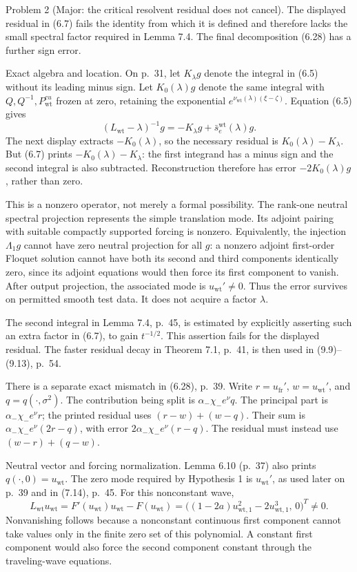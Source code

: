 \documentclass[10pt]{article}
\begin{document}
Problem 2 (Major: the critical resolvent residual does not cancel).  The displayed residual in (6.7) fails the identity from which it is defined and therefore lacks the small spectral factor required in Lemma 7.4. The final decomposition (6.28) has a further sign error.\par
Exact algebra and location. On p. 31, let \(K_\lambda g\) denote the integral in (6.5) without its leading minus sign. Let \(K_0(\lambda)g\) denote the same integral with \(Q,Q^{-1},P_\mathrm{wt}^{cu}\) frozen at zero, retaining the exponential \(e^{\nu_\mathrm{wt}(\lambda)(\xi-\zeta)}\). Equation (6.5) gives \[(L_\mathrm{wt}-\lambda)^{-1}g=-K_\lambda g+\bar s_e^\mathrm{wt}(\lambda)g.\] The next display extracts \(-K_0(\lambda)\), so the necessary residual is \(K_0(\lambda)-K_\lambda\). But (6.7) prints \(-K_0(\lambda)-K_\lambda\): the first integrand has a minus sign and the second integral is also subtracted. Reconstruction therefore has error \(-2K_0(\lambda)g\), rather than zero.\par
This is a nonzero operator, not merely a formal possibility. The rank-one neutral spectral projection represents the simple translation mode. Its adjoint pairing with suitable compactly supported forcing is nonzero. Equivalently, the injection \(\Lambda_1 g\) cannot have zero neutral projection for all \(g\): a nonzero adjoint first-order Floquet solution cannot have both its second and third components identically zero, since its adjoint equations would then force its first component to vanish. After output projection, the associated mode is \(u_\mathrm{wt}'\ne0\). Thus the error survives on permitted smooth test data. It does not acquire a factor \(\lambda\).\par
The second integral in Lemma 7.4, p. 45, is estimated by explicitly asserting such an extra factor in (6.7), to gain \(t^{-1/2}\). This assertion fails for the displayed residual. The faster residual decay in Theorem 7.1, p. 41, is then used in (9.9)–(9.13), p. 54.\par
There is a separate exact mismatch in (6.28), p. 39. Write \(r=u_\mathrm{fr}'\), \(w=u_\mathrm{wt}'\), and \(q=q(\cdot,\sigma^2)\). The contribution being split is \(\alpha_-\chi_-e^\nu q\). The principal part is \(\alpha_-\chi_-e^\nu r\); the printed residual uses \((r-w)+(w-q)\). Their sum is \(\alpha_-\chi_-e^\nu(2r-q)\), with error \(2\alpha_-\chi_-e^\nu(r-q)\). The residual must instead use \((w-r)+(q-w)\).\par
Neutral vector and forcing normalization. Lemma 6.10 (p. 37) also prints \(q(\cdot,0)=u_\mathrm{wt}\). The zero mode required by Hypothesis 1 is \(u_\mathrm{wt}'\), as used later on p. 39 and in (7.14), p. 45. For this nonconstant wave, \[L_\mathrm{wt}u_\mathrm{wt}=F'(u_\mathrm{wt})u_\mathrm{wt}-F(u_\mathrm{wt})
       =\big((1-2a)u_{\mathrm{wt},1}^2-2u_{\mathrm{wt},1}^3,\,0\big)^T\ne0.\] Nonvanishing follows because a nonconstant continuous first component cannot take values only in the finite zero set of this polynomial. A constant first component would also force the second component constant through the traveling-wave equations.\par
\end{document}
